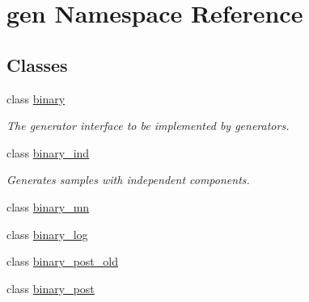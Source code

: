 \hypertarget{namespacegen}{
\section{gen Namespace Reference}
\label{namespacegen}
}
\subsection*{Classes}
\begin{CompactItemize}
\item 
class \hyperlink{classgen_1_1binary}{binary}
\begin{CompactList}\small\item\em The generator interface to be implemented by generators. \item\end{CompactList}\item 
class \hyperlink{classgen_1_1binary__ind}{binary\_\-ind}
\begin{CompactList}\small\item\em Generates samples with independent components. \item\end{CompactList}\item 
class \hyperlink{classgen_1_1binary__mn}{binary\_\-mn}
\item 
class \hyperlink{classgen_1_1binary__log}{binary\_\-log}
\item 
class \hyperlink{classgen_1_1binary__post__old}{binary\_\-post\_\-old}
\item 
class \hyperlink{classgen_1_1binary__post}{binary\_\-post}
\end{CompactItemize}
